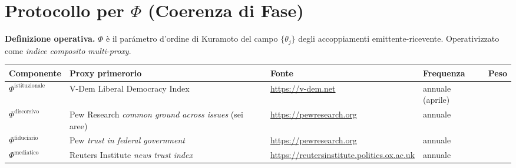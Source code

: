 \section{\texorpdfstring{Protocollo per \(\Phi\) (Coerenza di
Fase)}{Protocollo per \textbackslash Phi (Coerenza di Fase)}}\label{protocollo-per-phi-coerenza-di-fase}

\Hypoth{} \textbf{Definizione operativa.} \(\Phi\) è il parámetro
d'ordine di Kuramoto del campo \(\{\theta_j\}\) degli accoppiamenti
emittente-ricevente. Operativizzato come \emph{indice composito
multi-proxy}.

{\def\LTcaptype{none} %
{\small\begin{longtable}[]{@{}
  >{\raggedright\arraybackslash}p{}
  >{\raggedright\arraybackslash}p{}
  >{\raggedright\arraybackslash}p{}
  >{\raggedright\arraybackslash}p{}
  >{\raggedright\arraybackslash}p{}@{}}
\toprule\noalign{}
\begin{minipage}[b]{\linewidth}\raggedright
Componente
\end{minipage} & \begin{minipage}[b]{\linewidth}\raggedright
Proxy primerorio
\end{minipage} & \begin{minipage}[b]{\linewidth}\raggedright
Fonte
\end{minipage} & \begin{minipage}[b]{\linewidth}\raggedright
Frequenza
\end{minipage} & \begin{minipage}[b]{\linewidth}\raggedright
Peso
\end{minipage} \\
\midrule\noalign{}
\endhead
\bottomrule\noalign{}
\endlastfoot
\(\Phi^{\text{istituzionale}}\) & V-Dem Liberal Democracy Index &
\url{https://v-dem.net} & annuale (aprile) & 0.40 \\
\(\Phi^{\text{discorsivo}}\) & Pew Research \emph{common ground across
issues} (sei aree) & \url{https://pewresearch.org} & annuale & 0.25 \\
\(\Phi^{\text{fiduciario}}\) & Pew \emph{trust in federal government} &
\url{https://pewresearch.org} & annuale & 0.20 \\
\(\Phi^{\text{mediatico}}\) & Reuters Institute \emph{news trust index}
& \url{https://reutersinstitute.politics.ox.ac.uk} & annuale & 0.15 \\
\end{longtable}}
}

